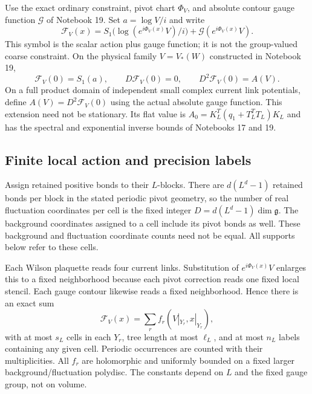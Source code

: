 \documentclass[11pt]{article}
\theoremstyle{remark}
\begin{document}
Use the exact ordinary constraint, pivot chart $\Phi_V$, and
absolute contour gauge function $\mathcal G$ of Notebook 19.
Set $a=\log V/i$ and write
\begin{equation}\label{bs-action}
 \mathcal F_V(x)=S_1\bigl(\log(e^{i\Phi_V(x)}V)/i\bigr)
                   +\mathcal G(e^{i\Phi_V(x)}V).
\end{equation}
This symbol is the scalar action plus gauge function; it is not
the group-valued coarse constraint. On the physical family
$V=V_*(W)$ constructed in Notebook 19,
\begin{equation}\label{bs-centered}
 \mathcal F_V(0)=S_1(a),\qquad D\mathcal F_V(0)=0,\qquad
 D^2\mathcal F_V(0)=A(V).
\end{equation}
On a full product domain of independent small complex current
link potentials, define $A(V)=D^2\mathcal F_V(0)$ using the
actual absolute gauge function. This extension need not be
stationary. Its flat value is
$A_0=K_L^T(q_1+T_L^TT_L)K_L$ and has the spectral and
exponential inverse bounds of Notebooks 17 and 19.

\subsection{Finite local action and precision labels}

Assign retained positive bonds to their $L$-blocks. There are
$d(L^d-1)$ retained bonds per block in the stated periodic pivot
geometry, so the number of real fluctuation coordinates per
cell is the fixed integer $D=d(L^d-1)\dim\mathfrak g$.
The background coordinates assigned to a cell include its pivot
bonds as well. These background and fluctuation coordinate
counts need not be equal. All supports below refer to these cells.

Each Wilson plaquette reads four current links. Substitution of
$e^{i\Phi_V(x)}V$ enlarges this to a fixed neighborhood because
each pivot correction reads one fixed local stencil. Each gauge
contour likewise reads a fixed neighborhood. Hence there is an
exact sum
\begin{equation}\label{bs-local-action}
 \mathcal F_V(x)=\sum_r f_r(V|_{Y_r},x|_{Y_r}),
\end{equation}
with at most $s_L$ cells in each $Y_r$, tree length at most
$\ell_L$, and at most $n_L$ labels containing any given cell.
Periodic occurrences are counted with their multiplicities.
All $f_r$ are holomorphic and uniformly bounded on a fixed
larger background/fluctuation polydisc. The constants depend
on $L$ and the fixed gauge group, not on volume.
\end{document}
